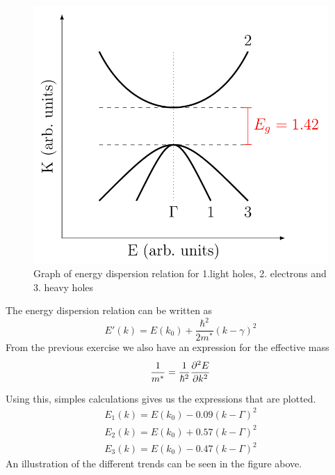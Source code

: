 \documentclass{article}
\begin{document}
\begin{figure}
	\includegraphics[width = 0.7\linewidth]{bandgap.png}
	\centering
	\caption{Graph of energy dispersion relation for 1.light holes, 2. electrons and 3. heavy holes}
\end{figure}

The energy dispersion relation can be written as
\begin{equation*}
	E'(k) = E(k_0) + \frac{\hbar^2}{2m^*}(k-\gamma)^2
\end{equation*}
From the previous exercise we also have an expression for the effective mass
\begin{equation*}
	\frac{1}{m^*} = \frac{1}{\hbar^2}\pdv[2]{E}{k}
\end{equation*}

Using this, simples calculations gives us the expressions that are plotted.
\begin{align*}
	E_1(k) = E(k_0)-0.09(k-\Gamma)^2\\
	E_2(k) = E(k_0)+0.57(k-\Gamma)^2\\
	E_3(k) = E(k_0)-0.47(k-\Gamma)^2
\end{align*}
An illustration of the different trends can be seen in the figure above.
\end{document}
